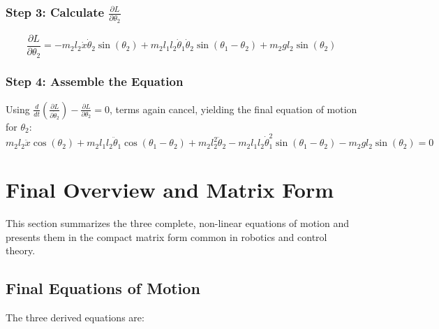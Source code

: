 \documentclass[12pt]{article}
\begin{document}
	\subsubsection*{Step 3: Calculate $\frac{\partial L}{\partial \theta_2}$}
	\[
	\frac{\partial L}{\partial \theta_2} = -m_2 l_2 \dot{x} \dot{\theta}_2 \sin(\theta_2) + m_2 l_1 l_2 \dot{\theta}_1 \dot{\theta}_2 \sin(\theta_1 - \theta_2) + m_2 g l_2 \sin(\theta_2)
	\]
	
	\subsubsection*{Step 4: Assemble the Equation}
	Using $\frac{d}{dt} \left( \frac{\partial L}{\partial \dot{\theta}_2} \right) - \frac{\partial L}{\partial \theta_2} = 0$, terms again cancel, yielding the final equation of motion for $\theta_2$:
	\begin{equation}
		m_2 l_2 \ddot{x} \cos(\theta_2) + m_2 l_1 l_2 \ddot{\theta}_1 \cos(\theta_1 \!-\! \theta_2) + m_2 l_2^2 \ddot{\theta}_2 - m_2 l_1 l_2 \dot{\theta}_1^2 \sin(\theta_1 \!-\! \theta_2) - m_2 g l_2 \sin(\theta_2) = 0
	\end{equation}
	
	\newpage
	\section{Final Overview and Matrix Form}
	
	This section summarizes the three complete, non-linear equations of motion and presents them in the compact matrix form common in robotics and control theory.
	
	\subsection{Final Equations of Motion}
	The three derived equations are:
	
\end{document}
